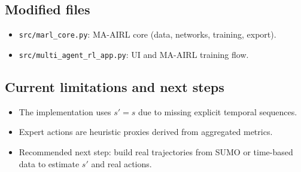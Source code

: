 \subsection{Modified files}
\begin{itemize}
\item \texttt{src/marl\_core.py}: MA-AIRL core (data, networks, training, export).
\item \texttt{src/multi\_agent\_rl\_app.py}: UI and MA-AIRL training flow.
\end{itemize}

\subsection{Current limitations and next steps}
\begin{itemize}
\item The implementation uses $s'=s$ due to missing explicit temporal sequences.
\item Expert actions are heuristic proxies derived from aggregated metrics.
\item Recommended next step: build real trajectories from SUMO or time-based data to estimate $s'$ and real actions.
\end{itemize}
